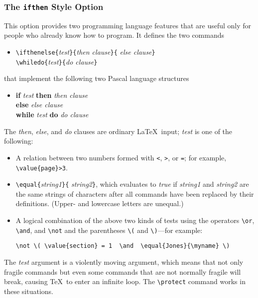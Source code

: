 \subsubsection{The {\tt ifthen} Style Option}

This option provides two programming language features that are useful
only for people who already know how to program.  It defines the
two commands
\begin{itemize} 
\item[]
\verb|\ifthenelse{|{\em test\/}\verb|}{|{\em then clause\/}\verb|}{|%
{\em else clause\/}\verb|}|\\
\verb|\whiledo{|{\em test\/}\verb|}{|{\em do clause\/}\verb|}|
\end{itemize}
that implement the following two Pascal language structures
\begin{itemize}
\item[]
\begin{tabbing}
{\bf if} {\em test\/} \= {\bf then} \= {\em then clause\/} \\
 \> {\bf else} \> {\em else clause\/} \\[2pt]
{\bf while} {\em test\/} {\bf do} {\em do clause\/}
\end{tabbing}
\end{itemize}
The {\em then\/}, {\em else\/}, and {\em do\/} clauses
are ordinary \LaTeX\ input; {\em test\/} is one of the following:
\begin{itemize}
 \item A relation between two numbers formed with {\tt <}, {\tt >},
or {\tt =}; for example, \hbox{\verb|\value{page}>3|}.
 \item \verb|\equal{|{\em string1\/}\verb|}{|%
{\em string2\/}\verb|}|, which evaluates to {\em true\/} if {\em
string1\/} and {\em string2\/} are the same strings of characters after
all commands have been replaced by their definitions.  (Upper- and
lowercase letters are unequal.)
 \item A logical combination of the above two kinds of tests
    using the operators \hbox{\verb|\or|}, \hbox{\verb|\and|},
    and \hbox{\verb|\not|} and the parentheses \hbox{\verb|\(|}
    and \hbox{\verb|\)|}---for example:
\begin{verbatim}
\not \( \value{section} = 1  \and  \equal{Jones}{\myname} \)
\end{verbatim}
\end{itemize}
The {\em test\/} argument is a violently moving argument, which means
that not only fragile commands but even some commands that are not
normally fragile will break, causing \TeX\ to enter an infinite loop.
The \verb|\protect| command works in these situations.

